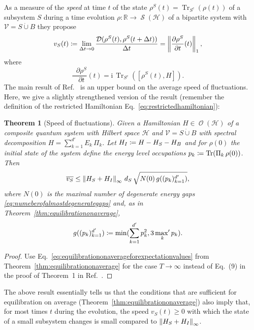 \documentclass[a4paper,12pt,listof=totoc,index=totoc,bibliography=totoc,headsepline=false,headings=normal,BCOR16.153846mm,DIV12,headinclude,twoside,cleardoublepage=empty,numbers=noenddot,final]{scrreprt}
\theoremstyle{mystyle}
\numberwithin{equation}{section}
\numberwithin{figure}{section}
\numberwithin{lemma}{section}
\newtheorem{theorem}{Theorem}
\numberwithin{theorem}{section}
\numberwithin{corollary}{section}
\numberwithin{definition}{section}
\numberwithin{conjecture}{section}
\numberwithin{observation}{section}
\newcommand{\+}{\mkern2mu}
\newcommand{\coloneqq}{\mathrel{\vcentcolon\mkern-1.2mu=}} %
\newcommand{\dunion}{\mathbin{\dot{\cup}}}
\newcommand{\texteqref}[1]{Eq.~\eqref{#1}}
\renewcommand{\min}{\mathchoice{\operatorname*{min}}{\operatorname*{min}}{\mathrm{min}}{\mathrm{min}}}
\renewcommand{\H}{H}
\newcommand{\Vset}{\mathcal{V}}
\newcommand{\norm}[2][]{
  \ifthenelse{\equal{#1}{}}
    {\left\| {#2} \right\|}
    {\ifthenelse{\equal{#1}{uinv}}
      {\left\vert\kern-0.25ex\left\vert\kern-0.25ex\left\vert {#2} \right\vert\kern-0.25ex\right\vert\kern-0.25ex\right\vert}
      {\left\| {#2} \right\|_{#1}}
    }
}
\newcommand{\taverage}[2][]{
  \ifthenelse{\equal{#1}{}}
  {\overline{#2}}
  {\overline{#2}^{#1}}
}
\newcommand{\tracedistance}[3][]{
  \ifthenelse{\equal{#2}{}}
  {\ifthenelse{\equal{#3}{}}
    {\mathcal{D}_{#1}}{}
  }{
    \ifthenelse{\equal{#1}{}}
    {\operatorname{\mathcal{D}}(#2,#3)}
    {\operatorname{\mathcal{D}}_{#1}(#2,#3)}
  }
}
\DeclareMathOperator*{\maxprime}{\mathrm{max}^\prime}
\newcommand{\del}{\mathop{}\!\partial}
\newcommand{\compl}[1]{{{#1}^c}}
\renewcommand{\i}{\mathrm{i}}
\DeclareMathOperator{\1}{\mathds{1}}
\DeclareMathOperator{\Obs}{\mathcal{O}}
\DeclareMathOperator{\Qst}{\mathcal{S}}
\DeclareMathOperator{\Tr}{Tr}
\newcommand{\mc}[1]{\mathcal{#1}}
\newcommand{\mcH}{\mc{H}}
\newcommand{\mb}[1]{\mathbb{#1}}
\newcommand{\R}{\mb{R}}
\begin{document}
As a measure of the \emph{speed} at time $t$ of the state $\rho^S(t) = \Tr_{\compl{S}}(\rho(t))$ of a subsystem $S$ during a time evolution $\rho \colon \R \to \Qst(\mcH)$ of a bipartite system with $\Vset = S \dunion B$ they propose
\begin{equation}
  v_S(t) \coloneqq \lim_{\Delta t \to 0} \frac{\tracedistance{\rho^S(t)}{\rho^S(t+\Delta t)}}{\Delta t} = \norm[1]{\frac{\del \rho^S}{\del t}(t)} ,
\end{equation}
where 
\begin{equation}
  \frac{\del \rho^S}{\del t}(t) = \i\, \Tr_{\compl{S}}([\rho^S(t),\H]) .
\end{equation}
The main result of Ref.~\cite{Linden10} is an upper bound on the average speed of fluctuations.
Here, we give a slightly strengthened version of the result (remember the definition of the restricted Hamiltonian \texteqref{eq:restrictedhamiltonian}):
\begin{theorem}[Speed of fluctuations] \label{thm:speedoffluctuations}
  Given a Hamiltonian $\H \in \Obs(\mcH)$ of a composite quantum system with Hilbert space $\mcH$ and $\Vset = S \dunion B$ with spectral decomposition $\H = \sum_{k=1}^{d'} E_k\,\Pi_k$.
  Let $\H_I \coloneqq \H - \H_S - \H_B$ and for $\rho(0)$ the initial state of the system define the energy level occupations $p_k \coloneqq \Tr(\Pi_k\,\rho(0))$.
  Then
  \begin{equation}
    \taverage{v_S} \leq \norm[\infty]{\H_S+\H_I}\,d_S\,\sqrt{N(0)\,g((p_k)_{k=1}^{d'})} ,
  \end{equation}
  where $N(0)$ is the maximal number of degenerate energy gaps \eqref{eq:numeberofalmostdegenerategaps} and, as in Theorem~\ref{thm:equilibrationonaverage},
  \begin{equation}
    g((p_k)_{k=1}^{d'}) \coloneqq \min(\sum_{k=1}^{d'} p_k^2, 3  \maxprime_k p_k ) .
  \end{equation}
\end{theorem}
\begin{proof}
  Use \texteqref{eq:equilibrationonaverageforexpectationvalues} from Theorem~\ref{thm:equilibrationonaverage} for the case $T\to\infty$ instead of Eq.~(9) in the proof of Theorem~1 in Ref.~\cite{Linden10}.
\end{proof}

The above result essentially tells us that the conditions that are sufficient for equilibration on average (Theorem~\ref{thm:equilibrationonaverage}) also imply that, for most times $t$ during the evolution, the speed $v_S(t) \geq 0$ with which the state of a small subsystem changes is small compared to $\norm[\infty]{\H_S+\H_I}$.
\end{document}

